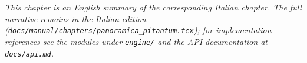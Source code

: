 \medskip
\noindent
\textit{This chapter is an English summary of the corresponding Italian chapter. The full narrative remains in the Italian edition (\texttt{docs/manual/chapters/panoramica\_pitantum.tex}); for implementation references see the modules under \texttt{engine/} and the API documentation at \texttt{docs/api.md}.}
